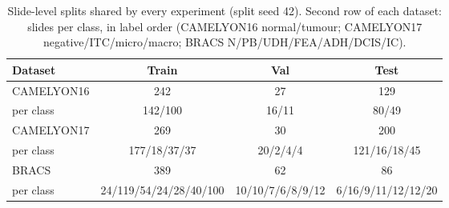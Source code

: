 \begin{table}[t]
\centering
\caption{Slide-level splits shared by every experiment (split seed 42). Second row of each dataset: slides per class, in label order (CAMELYON16 normal/tumour; CAMELYON17 negative/ITC/micro/macro; BRACS N/PB/UDH/FEA/ADH/DCIS/IC).}
\label{tab:splits}
\footnotesize
\setlength{\tabcolsep}{4pt}
\begin{tabular}{lccc}
\toprule
Dataset & Train & Val & Test \\
\midrule
CAMELYON16 & 242 & 27 & 129 \\
\quad per class & {\scriptsize 142/100} & {\scriptsize 16/11} & {\scriptsize 80/49} \\
\addlinespace
CAMELYON17 & 269 & 30 & 200 \\
\quad per class & {\scriptsize 177/18/37/37} & {\scriptsize 20/2/4/4} & {\scriptsize 121/16/18/45} \\
\addlinespace
BRACS & 389 & 62 & 86 \\
\quad per class & {\scriptsize 24/119/54/24/28/40/100} & {\scriptsize 10/10/7/6/8/9/12} & {\scriptsize 6/16/9/11/12/12/20} \\
\bottomrule
\end{tabular}
\end{table}
